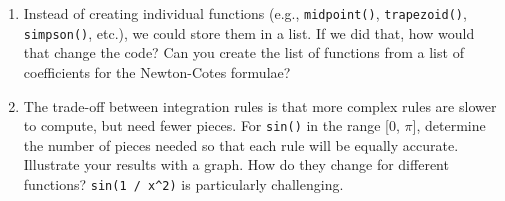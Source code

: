 \begin{enumerate}
\def\labelenumi{\arabic{enumi}.}
\item
  Instead of creating individual functions (e.g., \texttt{midpoint()},
  \texttt{trapezoid()}, \texttt{simpson()}, etc.), we could store them
  in a list. If we did that, how would that change the code? Can you
  create the list of functions from a list of coefficients for the
  Newton-Cotes formulae?
\item
  The trade-off between integration rules is that more complex rules are
  slower to compute, but need fewer pieces. For \texttt{sin()} in the
  range {[}0, \(\pi\){]}, determine the number of pieces needed so that
  each rule will be equally accurate. Illustrate your results with a
  graph. How do they change for different functions?
  \texttt{sin(1 / x\^{}2)} is particularly challenging.
\end{enumerate}
